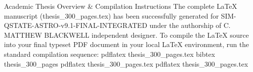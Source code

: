 Academic Thesis Overview & Compilation Instructions
The complete LaTeX manuscript (thesis_300_pages.tex) has been successfully generated for SIM-QSTATE-ASTRO-v9.1-FINAL-INTEGRATED under the authorship of C. MATTHEW BLACKWELL independent designer.
To compile the LaTeX source into your final typeset PDF document in your local LaTeX environment, run the standard compilation sequence:
pdflatex thesis_300_pages.tex
bibtex thesis_300_pages
pdflatex thesis_300_pages.tex
pdflatex thesis_300_pages.tex

